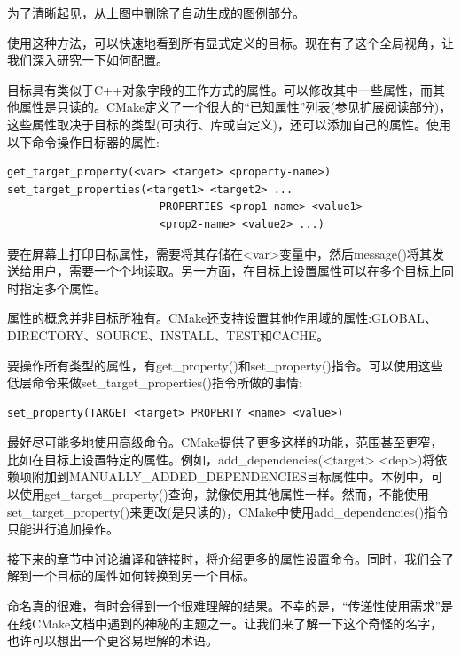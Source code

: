 为了清晰起见，从上图中删除了自动生成的图例部分。

使用这种方法，可以快速地看到所有显式定义的目标。现在有了这个全局视角，让我们深入研究一下如何配置。
 

目标具有类似于C++对象字段的工作方式的属性。可以修改其中一些属性，而其他属性是只读的。CMake定义了一个很大的“已知属性”列表(参见扩展阅读部分)，这些属性取决于目标的类型(可执行、库或自定义)，还可以添加自己的属性。使用以下命令操作目标器的属性:

\begin{lstlisting}[style=styleCMake]
get_target_property(<var> <target> <property-name>)
set_target_properties(<target1> <target2> ...
						PROPERTIES <prop1-name> <value1>
						<prop2-name> <value2> ...)
\end{lstlisting}

要在屏幕上打印目标属性，需要将其存储在<var>变量中，然后message()将其发送给用户，需要一个个地读取。另一方面，在目标上设置属性可以在多个目标上同时指定多个属性。

属性的概念并非目标所独有。CMake还支持设置其他作用域的属性:GLOBAL、DIRECTORY、SOURCE、INSTALL、TEST和CACHE。

要操作所有类型的属性，有get\_property()和set\_property()指令。可以使用这些低层命令来做set\_target\_properties()指令所做的事情:

\begin{lstlisting}[style=styleCMake]
set_property(TARGET <target> PROPERTY <name> <value>)
\end{lstlisting}

最好尽可能多地使用高级命令。CMake提供了更多这样的功能，范围甚至更窄，比如在目标上设置特定的属性。例如，add\_dependencies(<target> <dep>)将依赖项附加到MANUALLY\_ADDED\_DEPENDENCIES目标属性中。本例中，可以使用get\_target\_property()查询，就像使用其他属性一样。然而，不能使用set\_target\_property()来更改(是只读的)，CMake中使用add\_dependencies()指令只能进行追加操作。

接下来的章节中讨论编译和链接时，将介绍更多的属性设置命令。同时，我们会了解到一个目标的属性如何转换到另一个目标。


命名真的很难，有时会得到一个很难理解的结果。不幸的是，“传递性使用需求”是在线CMake文档中遇到的神秘的主题之一。让我们来了解一下这个奇怪的名字，也许可以想出一个更容易理解的术语。

